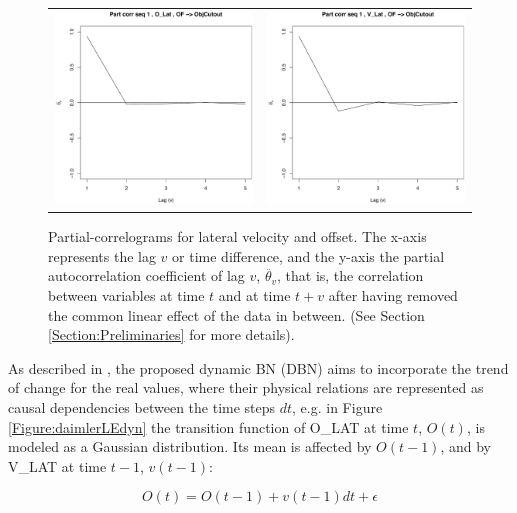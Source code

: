 \begin{figure}
  \centering
    \begin{tabular}{cc}
        \includegraphics[width=60mm]{figures/DaimlerPcorrOBJ_R5Offs.pdf}&
    \includegraphics[width=60mm]{figures/DaimlerPcorrOBJ_R5Vel.pdf}\\
  \end{tabular}
    \caption{\label{Figure:daimlerPartialCorrel}Partial-correlograms for lateral velocity and offset. The x-axis represents the lag $v$ or time difference, and the y-axis the partial autocorrelation coefficient of lag $v$, $\ddot{\theta_v}$, that is, the correlation between variables at time $t$ and at time $t+v$ after having removed the common linear effect of the data in between. (See Section \ref{Section:Preliminaries} for more details).}
\end{figure}


As described in \cite{Weidl2014}, the proposed dynamic BN (DBN) aims to incorporate the trend of change for the real values, where their physical relations are represented as causal dependencies between the time steps $dt$, e.g. in Figure \ref{Figure:daimlerLEdyn} the transition function of O\_LAT at time $t$, $O(t)$, is modeled as a Gaussian distribution. Its mean is affected by $O(t-1)$, and by V\_LAT at time $t-1$, $v(t-1)$:

\begin{equation}
O(t) =O(t-1) +v(t-1)dt +\epsilon
\end{equation}

